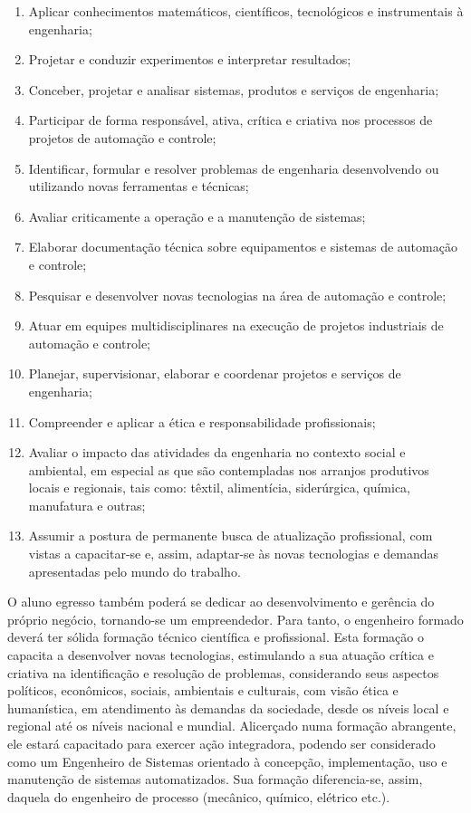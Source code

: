 \begin{enumerate}
	\item Aplicar conhecimentos matemáticos, científicos, tecnológicos e instrumentais à engenharia;
	\item Projetar e conduzir experimentos e interpretar resultados;
	\item Conceber, projetar e analisar sistemas, produtos e serviços de engenharia;
	\item Participar de forma responsável, ativa, crítica e criativa nos processos de projetos de automação e
	controle;
	\item Identificar, formular e resolver problemas de engenharia desenvolvendo ou utilizando novas ferramentas e técnicas;
	\item Avaliar criticamente a operação e a manutenção de sistemas;
	\item Elaborar documentação técnica sobre equipamentos e sistemas de automação e controle;
	\item Pesquisar e desenvolver novas tecnologias na área de automação e controle;
	\item Atuar em equipes multidisciplinares na execução de projetos industriais de automação e controle;
	\item Planejar, supervisionar, elaborar e coordenar projetos e serviços de engenharia;
	\item Compreender e aplicar a ética e responsabilidade profissionais;
	\item Avaliar o impacto das atividades da engenharia no contexto social e ambiental, em especial as que são contempladas nos arranjos produtivos locais e regionais, tais como: têxtil, alimentícia, siderúrgica, química, manufatura e outras;
	\item Assumir a postura de permanente busca de atualização profissional, com vistas a capacitar-se e, assim, adaptar-se às novas tecnologias e demandas apresentadas pelo mundo do trabalho.
\end{enumerate}

O aluno egresso também poderá se dedicar ao desenvolvimento e gerência do próprio negócio, tornando-se um empreendedor. Para tanto, o engenheiro formado deverá ter sólida formação técnico científica e profissional. Esta formação o capacita a desenvolver novas tecnologias, estimulando a sua atuação crítica e criativa na identificação e resolução de problemas, considerando seus aspectos políticos, econômicos, sociais, ambientais e culturais, com visão ética e humanística, em atendimento às demandas da sociedade, desde os níveis local e regional até os níveis nacional e mundial. Alicerçado numa formação abrangente, ele estará capacitado para exercer ação integradora, podendo ser considerado como um Engenheiro de Sistemas orientado à concepção, implementação, uso e manutenção de sistemas automatizados. Sua formação diferencia-se, assim, daquela do engenheiro de processo (mecânico, químico, elétrico etc.). 



